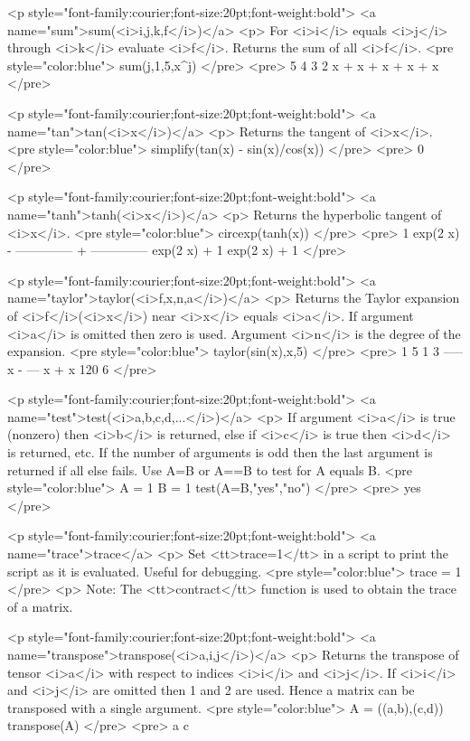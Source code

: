 <p style="font-family:courier;font-size:20pt;font-weight:bold">
<a name="sum">sum(<i>i,j,k,f</i>)</a>
<p>
For <i>i</i> equals <i>j</i> through <i>k</i> evaluate <i>f</i>.
Returns the sum of all <i>f</i>.
<pre style="color:blue">
sum(j,1,5,x^j)
</pre>
<pre>
 5    4    3    2
x  + x  + x  + x  + x
</pre>

<p style="font-family:courier;font-size:20pt;font-weight:bold">
<a name="tan">tan(<i>x</i>)</a>
<p>
Returns the tangent of <i>x</i>.
<pre style="color:blue">
simplify(tan(x) - sin(x)/cos(x))
</pre>
<pre>
0
</pre>

<p style="font-family:courier;font-size:20pt;font-weight:bold">
<a name="tanh">tanh(<i>x</i>)</a>
<p>
Returns the hyperbolic tangent of <i>x</i>.
<pre style="color:blue">
circexp(tanh(x))
</pre>
<pre>
        1             exp(2 x)
- -------------- + --------------
   exp(2 x) + 1     exp(2 x) + 1
</pre>

<p style="font-family:courier;font-size:20pt;font-weight:bold">
<a name="taylor">taylor(<i>f,x,n,a</i>)</a>
<p>
Returns the Taylor expansion of <i>f</i>(<i>x</i>) near <i>x</i> equals <i>a</i>.
If argument <i>a</i> is omitted then zero is used.
Argument <i>n</i> is the degree of the expansion.
<pre style="color:blue">
taylor(sin(x),x,5)
</pre>
<pre>
  1    5    1   3
----- x  - --- x  + x
 120        6
</pre>

<p style="font-family:courier;font-size:20pt;font-weight:bold">
<a name="test">test(<i>a,b,c,d,...</i>)</a>
<p>
If argument <i>a</i> is true (nonzero) then <i>b</i> is returned,
else if <i>c</i> is true then <i>d</i> is returned, etc.
If the number of arguments is odd then the last argument is returned
if all else fails.
Use A=B or A==B to test for A equals B.
<pre style="color:blue">
A = 1
B = 1
test(A=B,"yes","no")
</pre>
<pre>
yes
</pre>

<p style="font-family:courier;font-size:20pt;font-weight:bold">
<a name="trace">trace</a>
<p>
Set <tt>trace=1</tt> in a script to print the script as it is evaluated.
Useful for debugging.
<pre style="color:blue">
trace = 1
</pre>
<p>
Note: The <tt>contract</tt> function is used to obtain the trace of a matrix.

<p style="font-family:courier;font-size:20pt;font-weight:bold">
<a name="transpose">transpose(<i>a,i,j</i>)</a>
<p>
Returns the transpose of tensor <i>a</i> with respect to indices <i>i</i> and <i>j</i>.
If <i>i</i> and <i>j</i> are omitted then 1 and 2 are used.
Hence a matrix can be transposed with a single argument.
<pre style="color:blue">
A = ((a,b),(c,d))
transpose(A)
</pre>
<pre>
a   c

